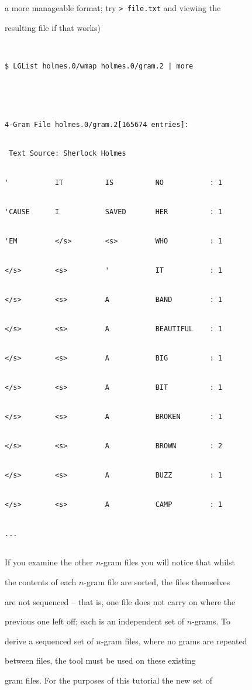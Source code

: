 a more manageable format; try {\tt > file.txt} and viewing the


resulting file if that works)


\begin{verbatim}


$ LGList holmes.0/wmap holmes.0/gram.2 | more





4-Gram File holmes.0/gram.2[165674 entries]:


 Text Source: Sherlock Holmes


'           IT          IS          NO           : 1


'CAUSE      I           SAVED       HER          : 1


'EM         </s>        <s>         WHO          : 1


</s>        <s>         '           IT           : 1


</s>        <s>         A           BAND         : 1


</s>        <s>         A           BEAUTIFUL    : 1


</s>        <s>         A           BIG          : 1


</s>        <s>         A           BIT          : 1


</s>        <s>         A           BROKEN       : 1


</s>        <s>         A           BROWN        : 2


</s>        <s>         A           BUZZ         : 1


</s>        <s>         A           CAMP         : 1


...


\end{verbatim} %


If you examine the other $n$-gram files you will notice that whilst


the contents of each $n$-gram file are sorted, the files themselves


are not sequenced -- that is, one file does not carry on where the


previous one left off; each is an independent set of $n$-grams.  To


derive a sequenced set of $n$-gram files, where no grams are repeated


between files, the tool  must be used on these existing


gram files.  For the purposes of this tutorial the new set of


